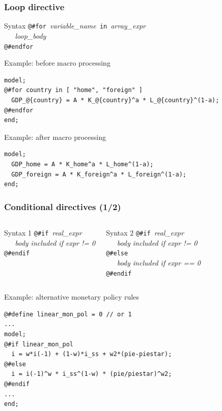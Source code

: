 \documentclass{beamer}
\begin{document}
\begin{frame}[fragile=singleslide]
  \frametitle{Loop directive}
  \begin{block}{Syntax}
\verb+@#for +\textit{variable\_name}\verb+ in +\textit{array\_expr} \\
\verb+   +\textit{loop\_body} \\
\verb+@#endfor+
  \end{block}
  \begin{block}{Example: before macro processing}
    \small
\begin{verbatim}
model;
@#for country in [ "home", "foreign" ]
  GDP_@{country} = A * K_@{country}^a * L_@{country}^(1-a);
@#endfor
end;
\end{verbatim}
    \normalsize
  \end{block}

  \begin{block}{Example: after macro processing}
    \small
\begin{verbatim}
model;
  GDP_home = A * K_home^a * L_home^(1-a);
  GDP_foreign = A * K_foreign^a * L_foreign^(1-a);
end;
\end{verbatim}
    \normalsize
  \end{block}
\end{frame}

\begin{frame}[fragile=singleslide]
  \frametitle{Conditional directives (1/2)}

  \begin{columns}[T]
    \begin{block}{Syntax 1}
\verb+@#if +\textit{real\_expr} \\
\verb+   +\textit{body included if expr != 0} \\
\verb+@#endif+
    \end{block}

    \begin{block}{Syntax 2}
\verb+@#if +\textit{real\_expr} \\
\verb+   +\textit{body included if expr != 0} \\
\verb+@#else+ \\
\verb+   +\textit{body included if expr == 0} \\
\verb+@#endif+
    \end{block}
  \end{columns}

  \begin{block}{Example: alternative monetary policy rules}
    \scriptsize
\begin{verbatim}
@#define linear_mon_pol = 0 // or 1
...
model;
@#if linear_mon_pol
  i = w*i(-1) + (1-w)*i_ss + w2*(pie-piestar);
@#else
  i = i(-1)^w * i_ss^(1-w) * (pie/piestar)^w2;
@#endif
...
end;
\end{verbatim}
    \scriptsize
  \end{block}
\end{frame}
\end{document}
